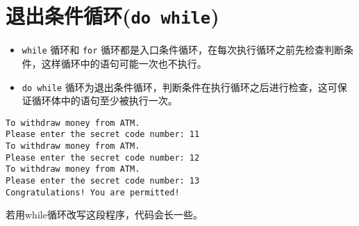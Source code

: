 \section{退出条件循环(\lstinline|do while|)}
\begin{frame}[fragile]\ft{\secname}
\begin{itemize}
\item
 \lstinline|while| 循环和 \lstinline|for| 循环都是入口条件循环，在每次执行循环之前先检查判断条件，这样循环中的语句可能一次也不执行。\\[0.1in]
\item 
  \lstinline|do while| 循环为退出条件循环，判断条件在执行循环之后进行检查，这可保证循环体中的语句至少被执行一次。
\end{itemize}
\end{frame}

\begin{frame}[fragile]\ft{\secname}


\end{frame}

\begin{frame}[fragile]\ft{\secname}
 \begin{lstlisting}[backgroundcolor=\color{red!10}]
To withdraw money from ATM.
Please enter the secret code number: 11
To withdraw money from ATM. 
Please enter the secret code number: 12
To withdraw money from ATM. 
Please enter the secret code number: 13
Congratulations! You are permitted!
\end{lstlisting}
\end{frame}

\begin{frame}\ft{\secname}
若用while循环改写这段程序，代码会长一些。



\end{frame}



